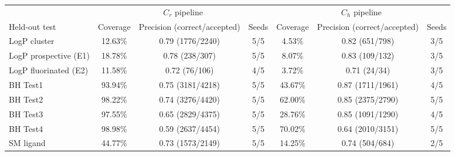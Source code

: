 \begin{tabular}{@{}lcccccc@{}}
\toprule
 & \multicolumn{3}{c}{$C_r$ pipeline} & \multicolumn{3}{c}{$C_h$ pipeline} \\
\cmidrule(lr){2-4}\cmidrule(lr){5-7}
Held-out test & Coverage & Precision (correct/accepted) & Seeds & Coverage & Precision (correct/accepted) & Seeds \\
\midrule
LogP cluster & 12.63\% & 0.79 (1776/2240) & 5/5 & 4.53\% & 0.82 (651/798) & 3/5 \\
LogP prospective (E1) & 18.78\% & 0.78 (238/307) & 5/5 & 8.07\% & 0.83 (109/132) & 3/5 \\
LogP fluorinated (E2) & 11.58\% & 0.72 (76/106) & 4/5 & 3.72\% & 0.71 (24/34) & 3/5 \\
BH Test1 & 93.94\% & 0.75 (3181/4218) & 5/5 & 43.67\% & 0.87 (1711/1961) & 4/5 \\
BH Test2 & 98.22\% & 0.74 (3276/4420) & 5/5 & 62.00\% & 0.85 (2375/2790) & 5/5 \\
BH Test3 & 97.55\% & 0.65 (2829/4375) & 5/5 & 28.76\% & 0.85 (1091/1290) & 4/5 \\
BH Test4 & 98.98\% & 0.59 (2637/4454) & 5/5 & 70.02\% & 0.64 (2010/3151) & 5/5 \\
SM ligand & 44.77\% & 0.73 (1573/2149) & 5/5 & 14.25\% & 0.74 (504/684) & 2/5 \\
\bottomrule
\end{tabular}